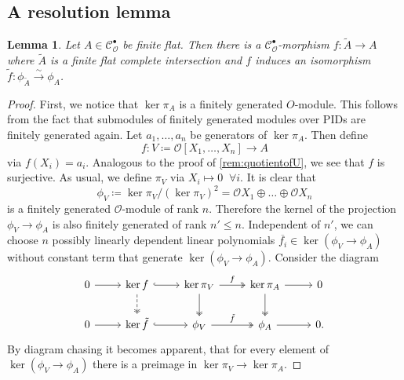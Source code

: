 \documentclass{article}
\theoremstyle{plain}%
\newtheorem{lemma}[theorem]{Lemma}
\theoremstyle{definition}
\theoremstyle{remark}
\newcommand{\cob}{\mathcal{C}_\mathcal{O}^\bullet}
\begin{document}
\subsection{A resolution lemma}

\begin{lemma}\label{lem:resolution}\textup{\cite[theorem 5.26]{Darmon1995}}
    Let \(A \in \cob\) be finite flat. Then there is a \(\cob\)-morphism \(f\colon \tilde A \to A\) 
    where \(\tilde A\) is a finite flat complete intersection and \(f\) induces an isomorphism
    \(\tilde f \colon \phi_{\tilde{A}} \xrightarrow{\sim} \phi_A\).
\end{lemma}
\begin{proof}
    First, we notice that \(\ker \pi_A\) is a finitely generated \(O\)-module.
    This follows from the fact that submodules of finitely generated modules over PIDs
    are finitely generated again.
    Let \(a_1, \dots, a_n\) be generators of \(\ker \pi_A\). Then define
    \[
        f\colon V \coloneqq \mathcal{O}[X_1, \dots, X_n] \to A  
    \]
    via \(f(X_i) = a_i\).
    Analogous to the proof of \cref{rem:quotientofU}, we see that \(f\) is surjective.
    As usual, we define \(\pi_V\) via \(X_i \mapsto 0\;\; \forall i\).
    It is clear that
    \[
        \phi_V \coloneqq \ker \pi_V/(\ker \pi_V)^2 = \mathcal{O}X_1 \oplus \dots \oplus \mathcal{O}X_n
    \] 
    is a finitely generated \(\mathcal{O}\)-module of rank \(n\).
    Therefore the kernel of the projection \(\phi_V \to \phi_A\) is also finitely generated 
    of rank \(n' \leq n\).
    Independent of \(n'\), we can choose \(n\) possibly linearly dependent linear polynomials 
    \(\overline{f_i} \in \ker(\phi_V \to \phi_A)\) without constant term that generate 
    \(\ker(\phi_V \to \phi_A)\).
    Consider the diagram
    \[
        \begin{tikzcd}
            0 \arrow[r]& \ker f \arrow[d, dashed, two heads]\arrow[r, hook] & \ker \pi_V \arrow[d, two heads]\arrow[r, "f", two heads] 
            &\ker \pi_A \arrow[d, two heads]\arrow[r] & 0\\
            0 \arrow[r]& \ker \tilde f \arrow[r, hook] & \phi_V \arrow[r, "\tilde f", two heads] &\phi_A \arrow[r] & 0.
        \end{tikzcd}
    \]
    By diagram chasing it becomes apparent, that for every element of \(\ker(\phi_V \to \phi_A)\) there is
    a preimage in \(\ker \pi_V \to \ker \pi_A\).


\end{proof}
\end{document}
